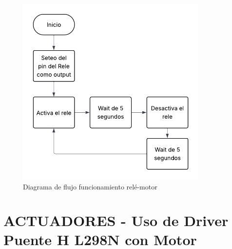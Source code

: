 \begin{figure}[H]
    \centering
    \includegraphics[width=0.85\textwidth]{./img/flujo_rele.png}
    \caption{Diagrama de flujo funcionamiento relé-motor}
    \label{fig:motor_driver}
\end{figure}


\section{ACTUADORES - Uso de Driver Puente H L298N con Motor}

